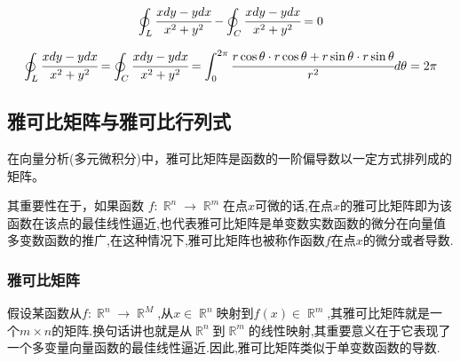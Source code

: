 \documentclass[UTF8,12pt]{ctexbook}
\newcommand{\defFunction}[1]{f(#1)}
\newcommand{\definiteIntegral}[2]{\int^{#1}_{#2}}
\newcommand{\curveIntegralOnLine}[1]{\oint_{#1}}
\DeclareMathOperator{\mathRealNumberCollection}{\mathbb{R}}
\begin{document}
{{{{\begin{enumerate}
{\begin{enumerate}
{\begin{enumerate}
{                              \begin{center}
                              \end{center}
                              $$
                                \curveIntegralOnLine{L}\cfrac{xdy - ydx}{x^2 + y^2} - \curveIntegralOnLine{C}\cfrac{xdy - ydx}{x^2 + y^2} = 0
                              $$

                              $$
                                \curveIntegralOnLine{L}\cfrac{xdy - ydx}{x^2 + y^2} = \curveIntegralOnLine{C}\cfrac{xdy - ydx}{x^2 + y^2} = \definiteIntegral{2\pi}{0}\cfrac{r\cos\theta \cdot r\cos\theta + r\sin\theta \cdot r\sin\theta}{r^2}d\theta = 2\pi
                              $$
                              }
                      \end{enumerate}
                      }
              \end{enumerate}
              }
      \end{enumerate}
    }%

  }%

  \subsection{雅可比矩阵与雅可比行列式}{
    在向量分析(多元微积分)中，雅可比矩阵是函数的一阶偏导数以一定方式排列成的矩阵。

    其重要性在于，如果函数 $f:\mathRealNumberCollection^n \to \mathRealNumberCollection^m$在点$x$可微的话,在点$x$的雅可比矩阵即为该函数在该点的最佳线性逼近,也代表雅可比矩阵是单变数实数函数的微分在向量值多变数函数的推广,在这种情况下,雅可比矩阵也被称作函数$f$在点$x$的微分或者导数.

    \subsubsection{雅可比矩阵}{
      假设某函数从$f : \mathRealNumberCollection^n \to \mathRealNumberCollection^M$,从$x\in\mathRealNumberCollection^n$映射到$\defFunction{x}\in\mathRealNumberCollection^m$,其雅可比矩阵就是一个$m \times n$的矩阵.换句话讲也就是从$\mathRealNumberCollection^n$到$\mathRealNumberCollection^m$的线性映射,其重要意义在于它表现了一个多变量向量函数的最佳线性逼近.因此,雅可比矩阵类似于单变数函数的导数.

}}}}
\end{document}
